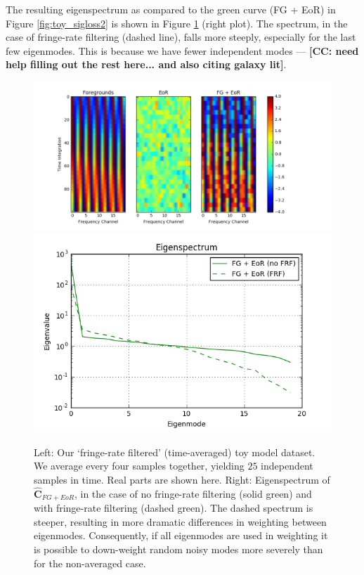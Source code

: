 \documentclass[preprint2,numberedappendix,tighten]{aastex6}  %
\newcommand{\cc}[1]{{\color{purple} \textbf{[CC: #1]}}}
\begin{document}
The resulting eigenspectrum as compared to the green curve (FG + EoR) in Figure \ref{fig:toy_sigloss2} is shown in Figure \ref{fig:toy_sigloss5} (right plot). The spectrum, in the case of fringe-rate filtering (dashed line), falls more steeply, especially for the last few eigenmodes. This is because we have fewer independent modes --- \cc{need help filling out the rest here... and also citing galaxy lit}.

\begin{figure}
	\centering
	\includegraphics[trim={1.5cm 0.2cm 3.5cm 0.3cm},clip,height=0.3\textwidth]{plots/toy_sigloss5.png}
	\includegraphics[trim={0.3cm 0.2cm 0.3cm 0.3cm},clip,height=0.3\textwidth]{plots/toy_sigloss15.png}
	\caption{Left: Our `fringe-rate filtered' (time-averaged) toy model dataset. We average every four samples together, yielding $25$ independent samples in time. Real parts are shown here. Right: Eigenspectrum of $\hat{\textbf{C}}_{FG+EoR}$, in the case of no fringe-rate filtering (solid green) and with fringe-rate filtering (dashed green). The dashed spectrum is steeper, resulting in more dramatic differences in weighting between eigenmodes. Consequently, if all eigenmodes are used in weighting it is possible to down-weight random noisy modes more severely than for the non-averaged case.}
	\label{fig:toy_sigloss5}
\end{figure}
\end{document}
